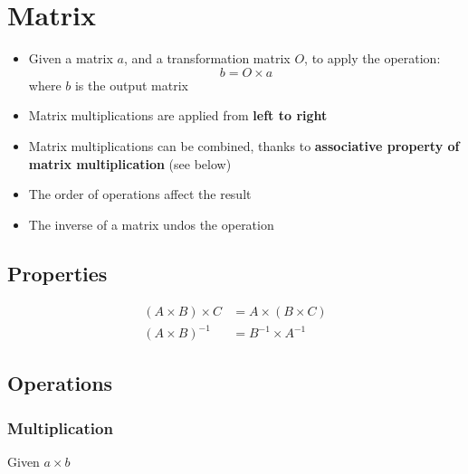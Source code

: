 \chapter{Matrix}

\begin{itemize}
  \item Given a matrix $ a $, and a transformation matrix $ O $, to apply
  the operation:
  \begin{equation}
    b = O \times a
  \end{equation}
  where $ b $ is the output matrix

  \item Matrix multiplications are applied from \textbf{left to right}
  \item Matrix multiplications can be combined, thanks to \textbf{associative
  property of matrix multiplication} (see below)
  \item The order of operations affect the result
  \item The inverse of a matrix undos the operation
\end{itemize}

\section{Properties}

  \begin{align}
    \left( A \times B \right) \times C &= A \times \left( B \times C \right) \\
    \left( A \times B \right)^{-1} &= B^{-1} \times A^{-1}
  \end{align}

\section{Operations}

  \subsection{Multiplication}

    Given $ a \times b $

    \begin{algorithm}[H]
    \end{algorithm}

